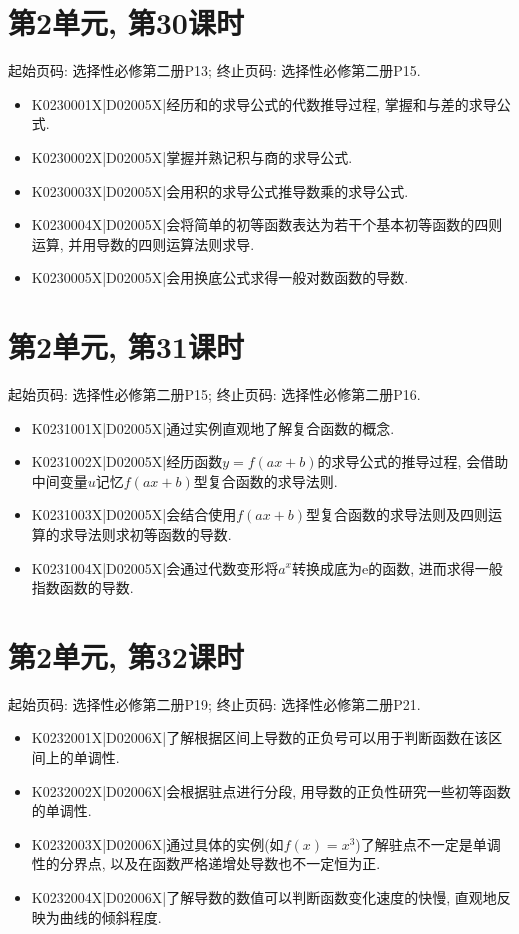 \section*{第2单元, 第30课时}
起始页码: 选择性必修第二册P13; 终止页码: 选择性必修第二册P15.
\begin{itemize}
\item K0230001X|D02005X|经历和的求导公式的代数推导过程, 掌握和与差的求导公式.
\item K0230002X|D02005X|掌握并熟记积与商的求导公式.
\item K0230003X|D02005X|会用积的求导公式推导数乘的求导公式.
\item K0230004X|D02005X|会将简单的初等函数表达为若干个基本初等函数的四则运算, 并用导数的四则运算法则求导.
\item K0230005X|D02005X|会用换底公式求得一般对数函数的导数.
\end{itemize}

\section*{第2单元, 第31课时}
起始页码: 选择性必修第二册P15; 终止页码: 选择性必修第二册P16.
\begin{itemize}
\item K0231001X|D02005X|通过实例直观地了解复合函数的概念.
\item K0231002X|D02005X|经历函数$y=f(ax+b)$的求导公式的推导过程, 会借助中间变量$u$记忆$f(ax+b)$型复合函数的求导法则.
\item K0231003X|D02005X|会结合使用$f(ax+b)$型复合函数的求导法则及四则运算的求导法则求初等函数的导数.
\item K0231004X|D02005X|会通过代数变形将$a^x$转换成底为$\mathrm{e}$的函数, 进而求得一般指数函数的导数.
\end{itemize}

\section*{第2单元, 第32课时}
起始页码: 选择性必修第二册P19; 终止页码: 选择性必修第二册P21.
\begin{itemize}
\item K0232001X|D02006X|了解根据区间上导数的正负号可以用于判断函数在该区间上的单调性.
\item K0232002X|D02006X|会根据驻点进行分段, 用导数的正负性研究一些初等函数的单调性.
\item K0232003X|D02006X|通过具体的实例(如$f(x)=x^3$)了解驻点不一定是单调性的分界点, 以及在函数严格递增处导数也不一定恒为正.
\item K0232004X|D02006X|了解导数的数值可以判断函数变化速度的快慢, 直观地反映为曲线的倾斜程度.
\end{itemize}

